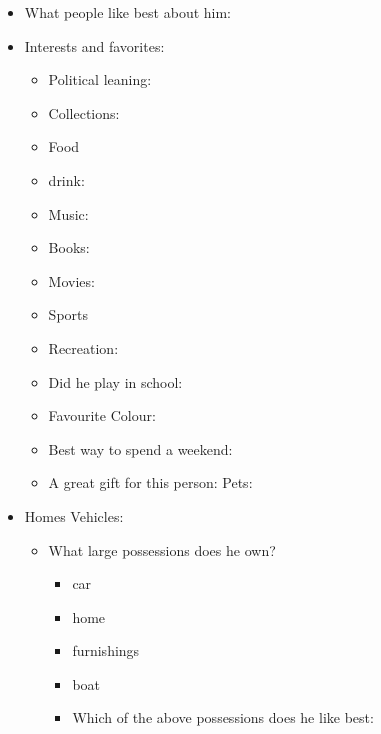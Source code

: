 \documentclass[openleft,oneside,showtrims]{memoir}
\begin{document}
\begin{itemize}
\item What people like best about him:
\label{sec:org8fb0fa9}

\item Interests and favorites:
\label{sec:org39e2208}

\begin{itemize}
\item Political leaning:

\item Collections:

\item Food

\item drink:

\item Music:

\item Books:

\item Movies:

\item Sports

\item Recreation:

\item Did he play in school:

\item Favourite Colour:

\item Best way to spend a weekend:

\item A great gift for this person: Pets:
\end{itemize}

\item Homes Vehicles:
\label{sec:org7b89b72}

\begin{itemize}
\item What large possessions does he own?
\label{sec:org1c467e4}

\begin{itemize}
\item car

\item home

\item furnishings

\item boat

\item Which of the above possessions does he like best:
\end{itemize}


\end{itemize}
\end{itemize}
\end{document}
